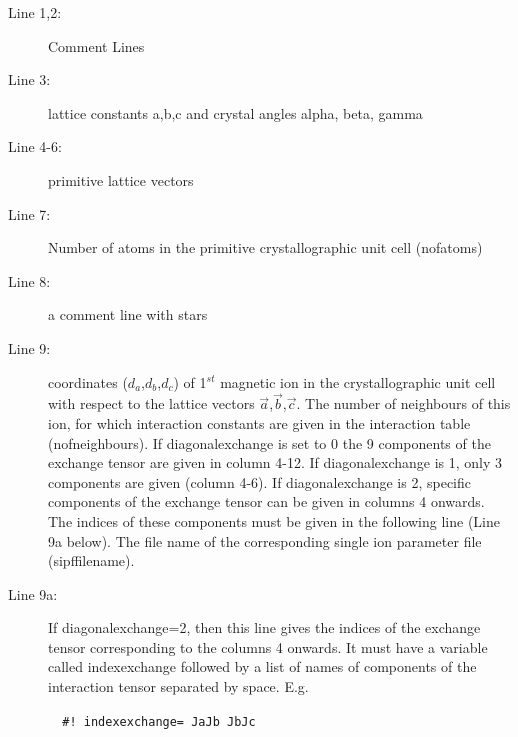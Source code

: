 \begin{description}
\item [Line 1,2:] Comment Lines
\item [Line 3:] lattice constants a,b,c and crystal angles alpha, beta, gamma 
\item [Line 4-6:] primitive lattice vectors
\item [Line 7:] Number of atoms in the primitive crystallographic unit cell ({\prg nofatoms})
\item [Line 8:] a comment line with stars
\item [Line 9:] coordinates  ($d_a$,$d_b$,$d_c$) of 1$^{st}$ magnetic ion in the crystallographic unit cell  with
respect to the lattice vectors $\vec a$,$\vec b$,$\vec c$. The number of neighbours of this 
ion, for which interaction constants are given in the interaction table (nofneighbours). 
If {\prg diagonalexchange}
is set to 0 the 9 components of the exchange tensor are given in column 4-12. 
If {\prg diagonalexchange}
 is 1, only 3 components are given (column 4-6).
If {\prg diagonalexchange}
 is 2, specific components of the exchange tensor can be given in columns 4 onwards. The indices of these components
 must be given in the following line (Line 9a below).
The file name of the corresponding single ion
parameter file (sipffilename).
\item [Line 9a:]  If {\prg diagonalexchange=2}, then this line gives the indices of the exchange tensor corresponding to 
 the columns 4 onwards. It must have a variable called {\prg indexexchange} followed by a list of names of components of the interaction
 tensor separated by space. E.g.

 \verb|  #! indexexchange= JaJb JbJc  | 


\end{description}
